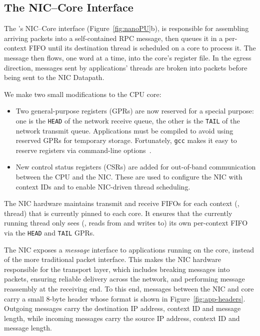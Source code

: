 \subsection{The NIC--Core Interface}
\label{ssec:niccore-interface}
The \name{}'s NIC--Core interface (Figure~\ref{fig:nanoPU}b), is responsible for assembling arriving packets into a self-contained RPC message, then queues it in a per-context FIFO until its destination thread is scheduled on a core to process it.
The message then flows, one word at a time, into the core's register file.
In the egress direction, messages sent by applications' threads are broken into packets before being sent to the NIC Datapath.

We make two small modifications to the CPU core:
\begin{itemize}
    \item Two general-purpose registers (GPRs) are now reserved for a special purpose: one is the \verb|HEAD| of the network receive queue, the other is the \verb|TAIL| of the network transmit queue.
    Applications must be compiled to avoid using reserved GPRs for temporary storage.
    Fortunately, \verb|gcc| makes it easy to reserve registers via command-line options~\cite{gcc-options}.
    \item New control status registers (CSRs) are added for out-of-band communication between the CPU and the NIC.
    These are used to configure the NIC with context IDs and to enable NIC-driven thread scheduling.
\end{itemize}

The NIC hardware maintains transmit and receive FIFOs for each context (\ie, thread) that is currently pinned to each core.
It ensures that the currently running thread only sees (\ie, reads from and writes to) its own per-context FIFO via the \verb|HEAD| and \verb|TAIL| GPRs.

The NIC exposes a {\em message} interface to applications running on the core, instead of the more traditional packet interface.
This makes the \name{} NIC hardware responsible for the transport layer, which includes breaking messages into packets, ensuring reliable delivery across the network, and performing message reassembly at the receiving end.
To this end, messages between the NIC and core carry a small 8-byte header whose format is shown in Figure~\ref{fig:app-headers}.
Outgoing messages carry the destination IP address, context ID and message length, while incoming messages carry the source IP address, context ID and message length.

